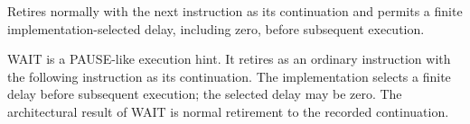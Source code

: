 Retires normally with the next instruction as its continuation and permits a finite implementation-selected delay, including zero, before subsequent execution.

WAIT is a PAUSE-like execution hint. It retires as an ordinary instruction with the following instruction as its
continuation. The implementation selects a finite delay before subsequent execution; the selected delay may be zero.
The architectural result of WAIT is normal retirement to the recorded continuation.
